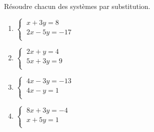 \documentclass[a4paper,11pt,exos]{nsi} %
\begin{document}
\begin{exercice}[ ]
	
	\begin{multicols}{3}
		Résoudre chacun des systèmes par substitution.\\
		\vspace{1cm}
		\begin{enumerate}
			\item 		$\left\{
			\begin{array}{l}
				\ x+3y=8 \\
				\ 2x-5y=-17\\
			\end{array} \right.$
			\item 		$\left\{
			\begin{array}{l}
				\ 2x+y=4 \\
				\ 5x+3y=9 \\
			\end{array} \right.$	
			\item 		$\left\{
			\begin{array}{l}
				\ 4x-3y=-13 \\
				\ 4x-y=1 \\
			\end{array} \right.$
			\item 		$\left\{
			\begin{array}{l}
				\ 8x+3y=-4 \\
				\ x+5y=1 \\
			\end{array} \right.$
		\end{enumerate}
	\end{multicols}
\end{exercice}
\end{document}
